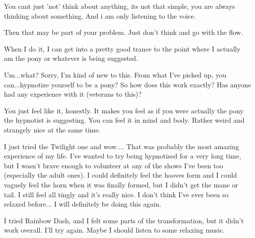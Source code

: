 \documentclass[ebook,12pt,oneside,openany]{memoir}
\begin{document}
\begin{tcolorbox}[title=Chigens and Kay,colback=olive!5!white,colframe=olive!75!black,coltitle=white]
\begin{tcolorbox}[title=Ponyworld Destroyer]
\par{You cant just 'not' think about anything, its not that simple, you are always thinking about something. And i am only listening to the voice.}
\end{tcolorbox}
\par{Then that may be part of your problem. Just don't think and go with the flow.}
\newline{}
\par{When I do it, I can get into a pretty good trance to the point where I actually am the pony or whatever is being suggested.}
\newline{}
\begin{tcolorbox}[title=blackopp1]
\par{Um...what? Sorry, I'm kind of new to this. From what I've picked up, you can...hypnotize yourself to be a pony? So how does this work exactly? Has anyone had any experience with it (veterans to this)?}
\end{tcolorbox}
\par{You just feel like it, honestly. It makes you feel as if you were actually the pony the hypnotist is suggesting. You can feel it in mind and body. Rather weird and strangely nice at the same time.}
\end{tcolorbox}
\begin{tcolorbox}[title=Sleepykitty]
\par{I just tried the Twilight one and wow.... That was probably the most amazing experience of my life. I've wanted to try being hypnotised for a very long time, but I wasn't brave enough to volunteer at any of the shows I've been too (especially the adult ones). I could definitely feel the hooves form and I could vaguely feel the horn when it was finally formed, but I didn't get the mane or tail. I still feel all tingly and it's really nice. I don't think I've ever been so relaxed before... I will definitely be doing this again.}
\end{tcolorbox}
\begin{tcolorbox}[title=C. Thunder Dash,colback=orange!5!white,colframe=orange!75!black,coltitle=white]
\par{I tried Rainbow Dash, and I felt some parts of the transformation, but it didn't work overall. I'll try again. Maybe I should listen to some relaxing music. }
\end{tcolorbox}
\end{document}

